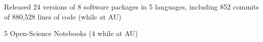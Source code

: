 \begin{veryTightItemize}
    \item Released 24 versions of 8 software packages in 5 languages, including 
        852 commits of 880,528 lines of code (while at AU)
    \item 5 Open-Science Notebooks (4 while at AU)
\end{veryTightItemize}
